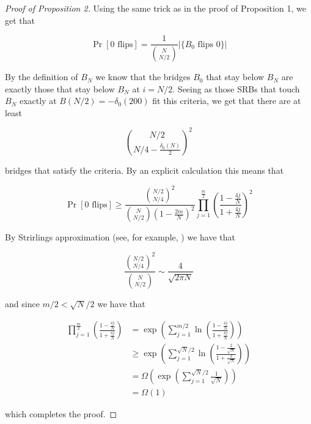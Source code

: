 \documentclass{article}
\theoremstyle{definition}
\begin{document}
\begin{proof}[Proof of Proposition 2]
Using the same trick as in the proof of Proposition 1, we get that

\begin{equation*}
\Pr[0\,\,\mathrm{flips}]=\frac{1}{{N \choose N/2}}|\{B_0 \,\, \mathrm{flips\,\, }0\}|
\end{equation*}

By the definition of $B_N$ we know that the bridges $B_0$ that stay below $B_N$ are exactly those that stay below $B_N$ at $i=N/2$. Seeing as those SRBs that touch $B_N$ exactly at $B(N/2)=-\delta_0(200)$ fit this criteria, we get that there are at least

$${N/2 \choose N/4-\frac{\delta_0(N)}{2}}^2$$

bridges that satisfy the criteria. By an explicit calculation this means that

\begin{equation*}
\Pr[0\,\,\mathrm{flips}]\geq \frac{{N/2 \choose N/4}^2}{{N \choose N/2}\left(1-\frac{2m}{N}\right)^{2}} \prod_{j=1}^{\frac{m}{2}}\left(\frac{1-\frac{4j}{N}}{1+\frac{4j}{N}}\right)^{2}
\end{equation*}

By Strirlings approximation (see, for example, \cite{eger2014stirling}) we have that

$$\frac{{N/2 \choose N/4}^2}{{N \choose N/2}}\sim \frac{4}{\sqrt{2\pi N}}$$

and since $m/2<\sqrt{N}/2$ we have that

\begin{align*}
\prod_{j=1}^{\frac{m}{2}}\left(\frac{1-\frac{4j}{N}}{1+\frac{4j}{N}}\right)&=\exp\left(\sum_{j=1}^{m/2}\ln\left(\frac{1-\frac{4j}{N}}{1+\frac{4j}{N}}\right)\right)\\
&\geq \exp\left(\sum_{j=1}^{\sqrt{N}/2}\ln\left(\frac{1-\frac{2}{\sqrt{N}}}{1+\frac{2}{\sqrt{N}}}\right)\right)\\
&=\Omega\left( \exp\left(\sum_{j=1}^{\sqrt{N}/2}\frac{1}{\sqrt{N}}\right)\right)\\
&=\Omega(1)
\end{align*}


which completes the proof.
\end{proof}




\end{document}
